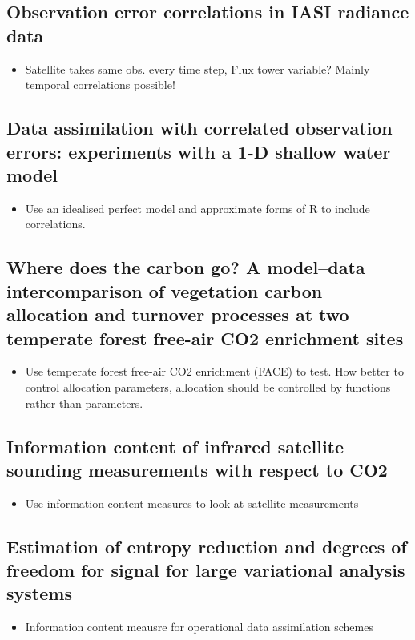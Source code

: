 \documentclass[11pt]{article}
\begin{document}
\subsection*{Observation error correlations in IASI radiance data \cite{stewart2009observation}}
\begin{itemize}
\item Satellite takes same obs. every time step, Flux tower variable? Mainly temporal correlations possible!
\end{itemize}


\subsection*{Data assimilation with correlated observation errors: experiments with a 1-D shallow water model \cite{stewart2013data}}
\begin{itemize}
\item Use an idealised perfect model and approximate forms of R to include correlations.
\end{itemize}


\subsection*{Where does the carbon go? A model--data intercomparison of vegetation carbon allocation and turnover processes at two temperate forest free-air CO2 enrichment sites \cite{de2014does}}
\begin{itemize}
\item Use temperate forest free-air CO2 enrichment (FACE) to test. How better to control allocation parameters, allocation should be controlled by functions rather than parameters.
\end{itemize}


\subsection*{Information content of infrared satellite sounding measurements with respect to CO2 \cite{engelen2004information}}
\begin{itemize}
\item Use information content measures to look at satellite measurements
\end{itemize}


\subsection*{Estimation of entropy reduction and degrees of freedom for signal for large variational analysis systems \cite{trove22713308}}
\begin{itemize}
\item Information content meausre for operational data assimilation schemes
\end{itemize}
\end{document}
